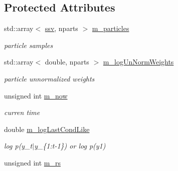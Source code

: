 \subsection*{Protected Attributes}
\begin{DoxyCompactItemize}
\item 
std\+::array$<$ \hyperlink{classpf_1_1APF_aa7fe7efd37dc23b06812aebdee256897}{ssv}, nparts $>$ \hyperlink{classpf_1_1APF_a6e1188f48abcdc3baf7e3713e2748d7e}{m\+\_\+particles}\hypertarget{classpf_1_1APF_a6e1188f48abcdc3baf7e3713e2748d7e}{}\label{classpf_1_1APF_a6e1188f48abcdc3baf7e3713e2748d7e}

\begin{DoxyCompactList}\small\item\em particle samples \end{DoxyCompactList}\item 
std\+::array$<$ double, nparts $>$ \hyperlink{classpf_1_1APF_a4253879203914c206ec1af6a02e6fcb5}{m\+\_\+log\+Un\+Norm\+Weights}\hypertarget{classpf_1_1APF_a4253879203914c206ec1af6a02e6fcb5}{}\label{classpf_1_1APF_a4253879203914c206ec1af6a02e6fcb5}

\begin{DoxyCompactList}\small\item\em particle unnormalized weights \end{DoxyCompactList}\item 
unsigned int \hyperlink{classpf_1_1APF_af32e1254a52911cf1a890a3f64b30967}{m\+\_\+now}\hypertarget{classpf_1_1APF_af32e1254a52911cf1a890a3f64b30967}{}\label{classpf_1_1APF_af32e1254a52911cf1a890a3f64b30967}

\begin{DoxyCompactList}\small\item\em curren time \end{DoxyCompactList}\item 
double \hyperlink{classpf_1_1APF_a056d43b5cfea970fb7da090e969e4fef}{m\+\_\+log\+Last\+Cond\+Like}\hypertarget{classpf_1_1APF_a056d43b5cfea970fb7da090e969e4fef}{}\label{classpf_1_1APF_a056d43b5cfea970fb7da090e969e4fef}

\begin{DoxyCompactList}\small\item\em log p(y\+\_\+t$\vert$y\+\_\+\{1\+:t-\/1\}) or log p(y1) \end{DoxyCompactList}\item 
unsigned int \hyperlink{classpf_1_1APF_a81cf31027072208d3d7558c40adedeea}{m\+\_\+rs}\hypertarget{classpf_1_1APF_a81cf31027072208d3d7558c40adedeea}{}\label{classpf_1_1APF_a81cf31027072208d3d7558c40adedeea}


\end{DoxyCompactItemize}
